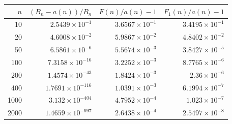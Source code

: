 \begin{tabular}{r r r r}
\toprule
$n$ & $(B_n-a(n))/B_n$ & $F(n)/a(n)-1$ & $F_1(n)/a(n)-1$ \\
\midrule
10 & $2.5439\times10^{-1}$ & $3.6567\times10^{-1}$ & $3.4195\times10^{-1}$ \\
20 & $4.6008\times10^{-2}$ & $5.9867\times10^{-2}$ & $4.8402\times10^{-2}$ \\
50 & $6.5861\times10^{-6}$ & $5.5674\times10^{-3}$ & $3.8427\times10^{-5}$ \\
100 & $7.3158\times10^{-16}$ & $3.2252\times10^{-3}$ & $8.7765\times10^{-6}$ \\
200 & $1.4574\times10^{-43}$ & $1.8424\times10^{-3}$ & $2.36\times10^{-6}$ \\
400 & $1.7691\times10^{-116}$ & $1.0391\times10^{-3}$ & $6.1994\times10^{-7}$ \\
1000 & $3.132\times10^{-404}$ & $4.7952\times10^{-4}$ & $1.023\times10^{-7}$ \\
2000 & $1.4659\times10^{-997}$ & $2.6438\times10^{-4}$ & $2.5497\times10^{-8}$ \\
\bottomrule
\end{tabular}
